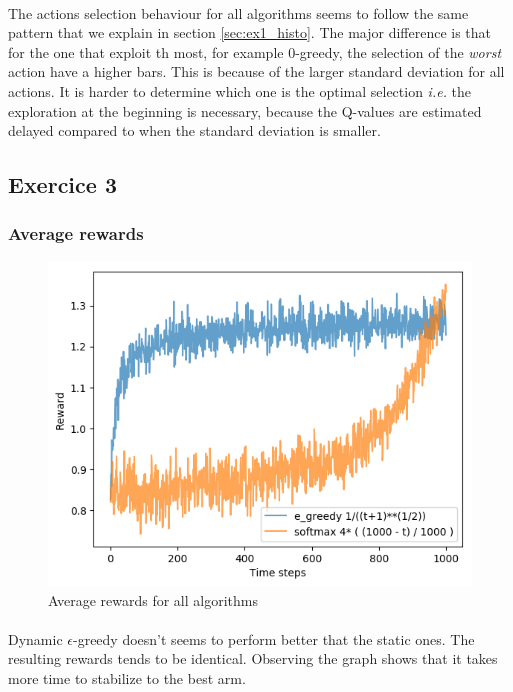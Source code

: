 \documentclass[letterpaper]{article}
\begin{document}
\paragraph{}

The actions selection behaviour for all algorithms seems to follow
the same pattern that we explain in section \ref{sec:ex1_histo}.
The major difference is that for the one that exploit th most, for example
$0$-greedy, the selection of the \textit{worst} action have a higher
bars. This is because of the larger standard deviation for all actions.
It is harder to determine which one is the optimal selection \textit{i.e.}
the exploration at the beginning is necessary, because the Q-values
are estimated delayed compared to when the standard deviation is smaller.

\subsection{Exercice 3}

\subsubsection{Average rewards}

\begin{figure}[H]
    \centering
    \includegraphics[width=.7\linewidth]{images/assign3/ex3/rewards}
    \caption{Average rewards for all algorithms}
    \label{fig:rewards_ex3}
\end{figure}

\paragraph{}

Dynamic $\epsilon$-greedy
doesn't seems to perform better that the static ones.
The resulting rewards tends to be identical. Observing the graph shows
that it takes more time to stabilize to the best arm.
\end{document}
